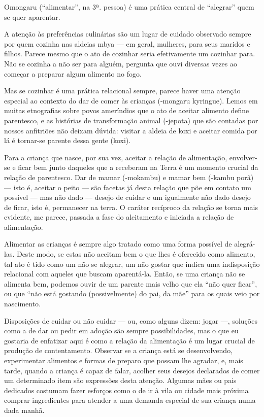 Omongaru (``alimentar'', na 3ª. pessoa) é uma prática central de ``alegrar''
quem se quer aparentar.

A atenção às preferências culinárias são um lugar de cuidado observado
sempre por quem cozinha nas aldeias mbya — em geral, mulheres, para
seus maridos e filhos. Parece mesmo que o ato de cozinhar seria
efetivamente um cozinhar para. Não se cozinha a não ser para alguém,
pergunta que ouvi diversas vezes ao começar a preparar algum alimento
no fogo. 

Mas se cozinhar é uma prática relacional sempre, parece haver uma
atenção especial ao contexto do dar de comer às crianças (-mongaru
kyringue). Lemos em muitas etnografias sobre povos ameríndios que o ato
de aceitar alimento define parentesco, e as histórias de transformação
animal (-jepota) que são contadas por nossos anfitriões não deixam
dúvida: visitar a aldeia de koxi e aceitar comida por lá é tornar-se
parente dessa gente (koxi).

Para a criança que nasce, por sua vez, aceitar a relação de alimentação,
envolver-se e ficar bem junto daqueles que a receberam na Terra é um
momento crucial da relação de parentesco. Dar de mamar (-mokambu) e
mamar bem (-kambu porã) — isto é, aceitar o peito — são facetas já
desta relação que põe em contato um possível — mas não dado — desejo de
cuidar e um igualmente não dado desejo de ficar, isto é, permanecer na
terra. O caráter recíproco da relação se torna mais evidente, me
parece, passada a fase do aleitamento e iniciada a relação de
alimentação.

Alimentar as crianças é sempre algo tratado como uma forma possível de
alegrá-las. Deste modo, se estas não aceitam bem o que lhes é oferecido
como alimento, tal ato é tido como um não se alegrar, um não gostar que
indica uma indisposição relacional com aqueles que buscam aparentá-la.
Então, se uma criança não se alimenta bem, podemos ouvir de um parente
mais velho que ela ``não quer ficar'', ou que ``não está gostando
(possivelmente) do pai, da mãe'' para os quais veio por nascimento.

Disposições de cuidar ou não cuidar — ou, como alguns dizem: jogar —,
soluções como a de dar ou pedir em adoção são sempre possibilidades,
mas o que eu gostaria de enfatizar aqui é como a relação da alimentação
é um lugar crucial de produção de contentamento. Observar se a criança
está se desenvolvendo, experimentar alimentos e formas de preparo que
possam lhe agradar, e, mais tarde, quando a criança é capaz de falar,
acolher seus desejos declarados de comer um determinado item são
expressões desta atenção. Algumas mães ou pais dedicados costumam fazer
esforços como o de ir à vila ou cidade mais próxima comprar
ingredientes para atender a uma demanda especial de sua criança numa
dada manhã.

